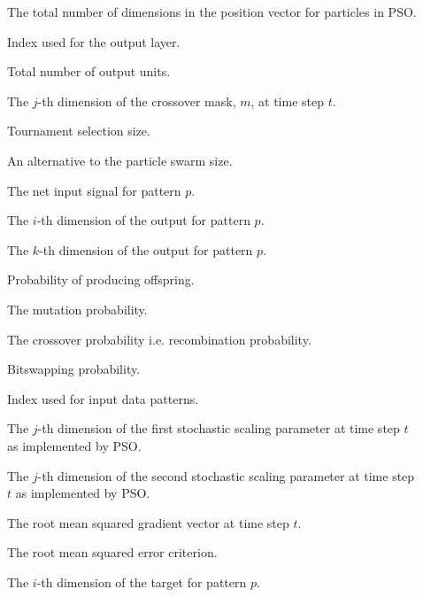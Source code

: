 \begin{description}
	\item [\parbox{2cm}{$J$}] \parbox{12.5cm}{The total number of dimensions in the position vector for particles in \acs{PSO}.}
	\item [\parbox{2cm}{$k$}] \parbox{12.5cm}{Index used for the output layer.}
	\item [\parbox{2cm}{$K$}] \parbox{12.5cm}{Total number of output units.}
	\item [\parbox{2cm}{$m_{j}(t)$}] \parbox{12.5cm}{The $j$-th dimension of the crossover mask, $m$, at time step $t$.}
	\item [\parbox{2cm}{$N_{t}$}] \parbox{12.5cm}{Tournament selection size.}
	\item [\parbox{2cm}{$N$}] \parbox{12.5cm}{An alternative to the particle swarm size.}
	\item [\parbox{2cm}{$net_{p}$}] \parbox{12.5cm}{The net input signal for pattern $p$.}
	\item [\parbox{2cm}{$o_{i,p}$}] \parbox{12.5cm}{The $i$-th dimension of the output for pattern $p$.}
	\item [\parbox{2cm}{$o_{k,p}$}] \parbox{12.5cm}{The $k$-th dimension of the output for pattern $p$.}
	\item [\parbox{2cm}{$p_{c}$}] \parbox{12.5cm}{Probability of producing offspring.}
	\item [\parbox{2cm}{$p_{m}$}] \parbox{12.5cm}{The mutation probability.}
	\item [\parbox{2cm}{$p_{r}$}] \parbox{12.5cm}{The crossover probability i.e. recombination probability.}
	\item [\parbox{2cm}{$p_{x}$}] \parbox{12.5cm}{Bitswapping probability.}
	\item [\parbox{2cm}{$p$}] \parbox{12.5cm}{Index used for input data patterns.}
	\item [\parbox{2cm}{$r_{1_{j}}(t)$}] \parbox{12.5cm}{The $j$-th dimension of the first stochastic scaling parameter at time step $t$ as implemented by \acs{PSO}.}
	\item [\parbox{2cm}{$r_{2_{j}}(t)$}] \parbox{12.5cm}{The $j$-th dimension of the second stochastic scaling parameter at time step $t$ as implemented by \acs{PSO}.}
	\item [\parbox{2cm}{$RMS[\boldsymbol{g}]_{t}$}] \parbox{12.5cm}{The root mean squared gradient vector at time step $t$.}
	\item [\parbox{2cm}{$RMS$}] \parbox{12.5cm}{The root mean squared error criterion.}
	\item [\parbox{2cm}{$t_{i,p}$}] \parbox{12.5cm}{The $i$-th dimension of the target for pattern $p$.}

\end{description}

